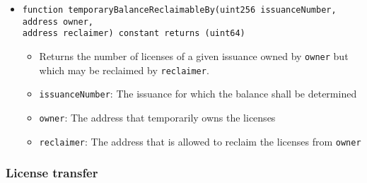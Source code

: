\documentclass[a4paper]{article}
\begin{document}
\begin{itemize}
  \item \texttt{function temporaryBalanceReclaimableBy(uint256 issuanceNumber, address owner, \\address reclaimer) constant returns (uint64)}
  \begin{itemize}
    \item Returns the number of licenses of a given issuance owned by \texttt{owner} but which may be reclaimed by \texttt{reclaimer}.
    \item \texttt{issuanceNumber}: The issuance for which the balance shall be determined
    \item \texttt{owner}: The address that temporarily owns the licenses
    \item \texttt{reclaimer}: The address that is allowed to reclaim the licenses from \texttt{owner}
  \end{itemize}
\end{itemize}

\subsubsection{License transfer}
\end{document}
